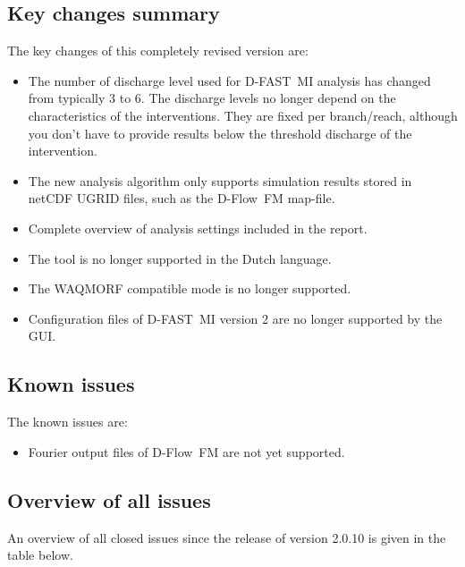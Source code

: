 \documentclass[git]{deltares_manual}
\newcommand{\dfmi}{\textrm{D-FAST~MI}\xspace}
\newcommand{\dflowfm}{\textrm{D-Flow~FM}\xspace}
\begin{document}
\subsection{Key changes summary}
The key changes of this completely revised version are:

\begin{itemize}
\item The number of discharge level used for \dfmi analysis has changed from typically 3 to 6.
The discharge levels no longer depend on the characteristics of the interventions.
They are fixed per branch/reach, although you don't have to provide results below the threshold discharge of the intervention.
\item The new analysis algorithm only supports simulation results stored in netCDF UGRID files, such as the \dflowfm map-file.
\item Complete overview of analysis settings included in the report.
\item The tool is no longer supported in the Dutch language.
\item The WAQMORF compatible  mode is no longer supported.
\item Configuration files of \dfmi version 2 are no longer supported by the GUI.
\end{itemize}

\subsection{Known issues}

The known issues are:

\begin{itemize}
\item Fourier output files of \dflowfm are not yet supported.
\end{itemize}

\subsection{Overview of all issues}

An overview of all closed issues since the release of version 2.0.10 is given in the table below.
\end{document}
